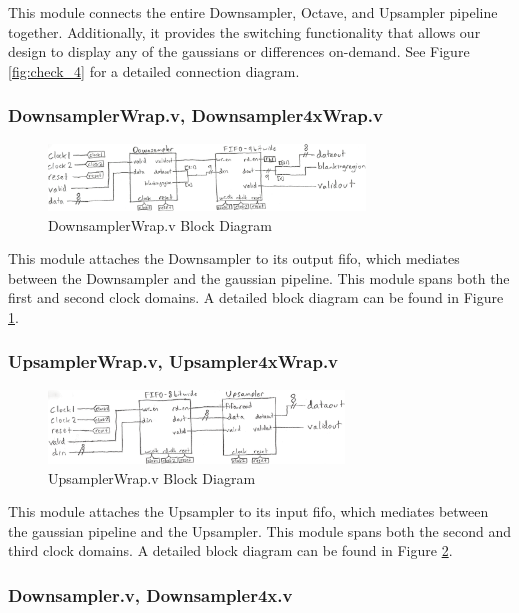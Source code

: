 This module connects the entire Downsampler, Octave, and Upsampler pipeline together.
Additionally, it provides the switching functionality that allows our design to 
display any of the gaussians or differences on-demand. See Figure \ref{fig:check_4} for 
a detailed connection diagram.

\subsubsection{DownsamplerWrap.v, Downsampler4xWrap.v}

\begin{figure}
    \centering
    \includegraphics[width=0.75\textwidth]{processed_image_pngs/DownsamplerWrap.png}
    \caption{DownsamplerWrap.v Block Diagram}
    \label{fig:down_wrap}
\end{figure}


This module attaches the Downsampler to its output fifo, which mediates between
the Downsampler and the gaussian pipeline. This module spans both the first
and second clock domains. A detailed block diagram can be found in Figure \ref{fig:down_wrap}.

\subsubsection{UpsamplerWrap.v, Upsampler4xWrap.v}

\begin{figure}
    \centering
    \includegraphics[width=0.7\textwidth]{processed_image_pngs/UpsamplerWrap.png}
    \caption{UpsamplerWrap.v Block Diagram}
    \label{fig:up_wrap}
\end{figure}


This module attaches the Upsampler to its input fifo, which mediates between
the gaussian pipeline and the Upsampler. This module spans both the second and
third clock domains. A detailed block diagram can be found in Figure \ref{fig:up_wrap}.

\subsubsection{Downsampler.v, Downsampler4x.v}

